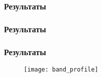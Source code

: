 \begin{frame}
    \frametitle{Результаты}
    \begin{figure}[h]
        \begin{minipage}[h]{0.49\linewidth}
            \center{\texttt{[image: 3d\_F1]}}
        \end{minipage}
        \hfill
        \begin{minipage}[h]{0.49\linewidth}
        \end{minipage}
    \end{figure}
\end{frame}

\begin{frame}
    \frametitle{Результаты}
    \begin{figure}[h]
        \begin{minipage}[h]{0.49\linewidth}
            \center{\texttt{[image: 3d\_F2]}}
        \end{minipage}
        \hfill
        \begin{minipage}[h]{0.49\linewidth}
        \end{minipage}
    \end{figure}
\end{frame}

\begin{frame}
    \frametitle{Результаты}
    \begin{figure}[h]
        \center
        \texttt{[image: band\_profile]}
    \end{figure}
\end{frame}